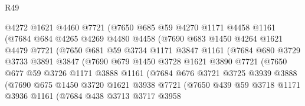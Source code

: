 \begin{lexlean}{R49}
\begin{coremodule}
                  @4272
                  @1621
                  @4460
                  @7721
                  (@7650
                    @685
                    @59
                    @4270
                    @1171
                    @4458
                    @1161
                    (@7684
                      @684
                      @4265
                      @4269
                      @4480
                      @4458
                      (@7690
                        @683
                        @1450
                        @4264
                        @1621
                        @4479
                        @7721
                        (@7650
                          @681
                          @59
                          @3734
                          @1171
                          @3847
                          @1161
                          (@7684
                            @680
                            @3729
                            @3733
                            @3891
                            @3847
                            (@7690
                              @679
                              @1450
                              @3728
                              @1621
                              @3890
                              @7721
                              (@7650
                                @677
                                @59
                                @3726
                                @1171
                                @3888
                                @1161
                                (@7684
                                  @676
                                  @3721
                                  @3725
                                  @3939
                                  @3888
                                  (@7690
                                    @675
                                    @1450
                                    @3720
                                    @1621
                                    @3938
                                    @7721
                                    (@7650
                                      @439
                                      @59
                                      @3718
                                      @1171
                                      @3936
                                      @1161
                                      (@7684
                                        @438
                                        @3713
                                        @3717
                                        @3958

\end{coremodule}
\end{lexlean}

